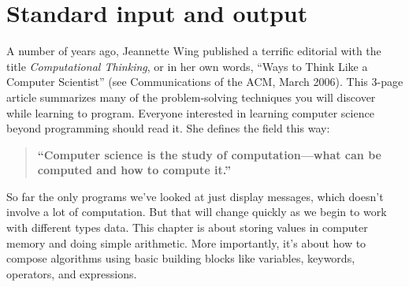 \chapter{Standard input and output}

A number of years ago, Jeannette Wing published a terrific editorial with the title {\it Computational Thinking}, or in her own words, ``Ways to Think Like a Computer Scientist'' (see Communications of the ACM, March 2006).
This 3-page article summarizes many of the problem-solving techniques you will discover while learning to program.
Everyone interested in learning computer science beyond programming should read it.
She defines the field this way:

\begin{quote}
{\bf ``Computer science is the study of computation---what can be computed and how to compute it.''}
\end{quote}

So far the only programs we've looked at just display messages, which doesn't involve a lot of computation.
But that will change quickly as we begin to work with different types data.
This chapter is about storing values in computer memory and doing simple arithmetic.
More importantly, it's about how to compose algorithms using basic building blocks like variables, keywords, operators, and expressions.
